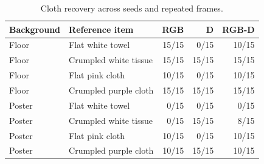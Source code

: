 \begin{table}[H]
\caption{Cloth recovery across seeds and repeated frames.}\label{tab:cloth-repeat-counts}
\centering\small
\begin{tabular}{llrrr}
\toprule Background & Reference item & RGB & D & RGB-D\\\midrule
Floor & Flat white towel & 15/15 & 0/15 & 10/15\\
Floor & Crumpled white tissue & 15/15 & 15/15 & 15/15\\
Floor & Flat pink cloth & 10/15 & 0/15 & 10/15\\
Floor & Crumpled purple cloth & 15/15 & 15/15 & 15/15\\
Poster & Flat white towel & 0/15 & 0/15 & 0/15\\
Poster & Crumpled white tissue & 0/15 & 15/15 & 8/15\\
Poster & Flat pink cloth & 10/15 & 0/15 & 10/15\\
Poster & Crumpled purple cloth & 10/15 & 15/15 & 10/15\\
\bottomrule\end{tabular}
\end{table}
